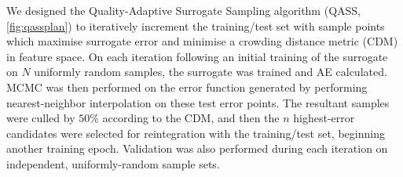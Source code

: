 
We designed the Quality-Adaptive Surrogate Sampling algorithm (QASS,
\cref{fig:qassplan}) to iteratively increment the training/test set with sample
points which maximise surrogate error and minimise a crowding distance metric
(CDM) \cite{Solonen2012} in feature space. On each iteration following an initial training of the surrogate on $N$ uniformly random samples, the surrogate was trained and AE calculated. MCMC was then performed on the error function generated by performing nearest-neighbor interpolation on these test error points. The resultant samples were culled by $50\%$ according to the CDM, and then the $n$ highest-error candidates were selected for reintegration with the training/test set, beginning another training epoch. Validation was also performed during each iteration on independent, uniformly-random sample sets.




